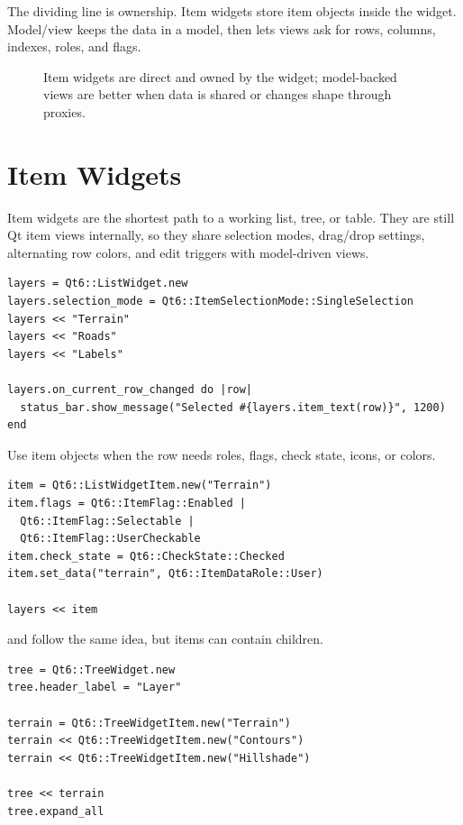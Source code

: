 The dividing line is ownership. Item widgets store item objects inside the widget. Model/view keeps the data in a model, then lets views ask for rows, columns, indexes, roles, and flags.

\begin{figure}[htbp]
  \centering
  \caption{Item widgets are direct and owned by the widget; model-backed views are better when data is shared or changes shape through proxies.}
\end{figure}

\section{Item Widgets}

Item widgets are the shortest path to a working list, tree, or table. They are still Qt item views internally, so they share selection modes, drag/drop settings, alternating row colors, and edit triggers with model-driven views.

\begin{lstlisting}[style=crystal]
layers = Qt6::ListWidget.new
layers.selection_mode = Qt6::ItemSelectionMode::SingleSelection
layers << "Terrain"
layers << "Roads"
layers << "Labels"

layers.on_current_row_changed do |row|
  status_bar.show_message("Selected #{layers.item_text(row)}", 1200)
end
\end{lstlisting}

Use item objects when the row needs roles, flags, check state, icons, or colors.

\begin{lstlisting}[style=crystal]
item = Qt6::ListWidgetItem.new("Terrain")
item.flags = Qt6::ItemFlag::Enabled |
  Qt6::ItemFlag::Selectable |
  Qt6::ItemFlag::UserCheckable
item.check_state = Qt6::CheckState::Checked
item.set_data("terrain", Qt6::ItemDataRole::User)

layers << item
\end{lstlisting}

 and  follow the same idea, but items can contain children.

\begin{lstlisting}[style=crystal]
tree = Qt6::TreeWidget.new
tree.header_label = "Layer"

terrain = Qt6::TreeWidgetItem.new("Terrain")
terrain << Qt6::TreeWidgetItem.new("Contours")
terrain << Qt6::TreeWidgetItem.new("Hillshade")

tree << terrain
tree.expand_all
\end{lstlisting}

